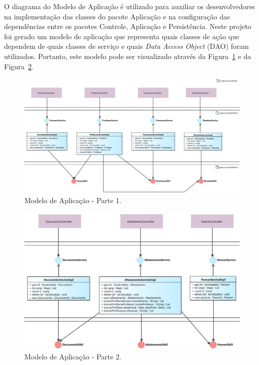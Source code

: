 O diagrama do Modelo de Aplicação é utilizado para auxiliar os desenvolvedores na implementação das classes do pacote Aplicação e na configuração das dependências entre os pacotes Controle, Aplicação e Persistência. Neste projeto foi gerado um modelo de aplicação que representa quais classes de ação que dependem de quais classes de serviço e quais \textit{Data Access Object} (DAO) foram utilizados. Portanto, este modelo pode ser visualizado através da Figura~\ref{figura-arquitetura-aplicacao1} e da Figura~\ref{figura-arquitetura-aplicacao2}. 

\begin{figure}[h]
	\centering
	\includegraphics[width=1\textwidth]{figuras/figura-arquitetura-aplicacao1.png}
	\caption{Modelo de Aplicação - Parte 1.}
	\label{figura-arquitetura-aplicacao1}
\end{figure}

\begin{figure}[h]
	\centering
	\includegraphics[width=1\textwidth]{figuras/figura-arquitetura-aplicacao2.png}
	\caption{Modelo de Aplicação - Parte 2.}
	\label{figura-arquitetura-aplicacao2}
\end{figure}


